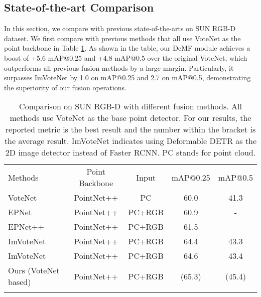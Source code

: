 \documentclass[runningheads]{llncs}
\begin{document}
\subsection{State-of-the-art Comparison}

In this section, we compare with previous state-of-the-arts on SUN RGB-D dataset. We first compare with previous methods that all use VoteNet as the point backbone in Table \ref{table:votenetbased}. As shown in the table, our DeMF module achieves a boost of +5.6 mAP@0.25 and +4.8 mAP@0.5 over the original VoteNet, which outperforms all previous fusion methods by a large margin. Particularly, it surpasses ImVoteNet by 1.0 on mAP@0.25 and 2.7 on mAP@0.5, demonstrating the superiority of our fusion operations. 

\setlength{\tabcolsep}{5pt}
\begin{table}[t]
\begin{center}
\caption{Comparison on SUN RGB-D with different fusion methods. All methods use VoteNet as the base point detector. For our results, the reported metric is the best result and the number within the bracket is the average result. ImVoteNet indicates using Deformable DETR as the 2D image detector instead of Faster RCNN. PC stands for point cloud.}
\vspace{6pt}
\label{table:votenetbased}
\begin{tabular}{lcccc}
\Xhline{0.8pt}\noalign{\smallskip}
Methods & Point Backbone & Input & mAP@0.25 & mAP@0.5\\
\noalign{\smallskip}
\hline
\noalign{\smallskip}
VoteNet~\cite{qi2019deep}\footnotemark[1] & PointNet++ & PC & 60.0 & 41.3\\
EPNet~\cite{10.1007/978-3-030-58555-6_3} & PointNet++ & PC+RGB & 60.9 & -\\
EPNet++~\cite{liu2022epnet} & PointNet++ & PC+RGB & 61.5 & -\\
ImVoteNet~\cite{qi2020imvotenet}\footnotemark[2] & PointNet++  & PC+RGB & 64.4 & 43.3\\
ImVoteNet~\cite{qi2020imvotenet} & PointNet++  & PC+RGB & 64.6 & 43.4 \\
Ours (VoteNet based)& PointNet++ & PC+RGB &   (65.3) &   (45.4) \\
\Xhline{0.8pt}
\end{tabular}
\end{center}
\end{table}
\setlength{\tabcolsep}{1.4pt}

\end{document}
